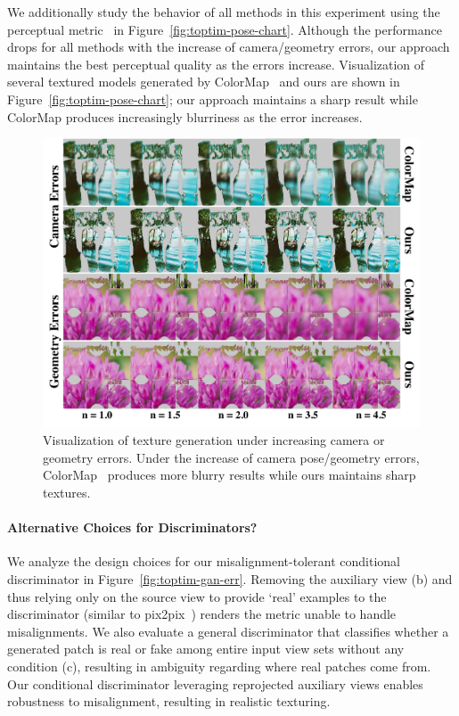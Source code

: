 We additionally study the behavior of all methods in this experiment using the perceptual metric~\cite{zhang2018unreasonable} in Figure~\ref{fig:toptim-pose-chart}.
Although the performance drops for all methods with the increase of camera/geometry errors, our approach maintains the best perceptual quality as the errors increase. Visualization of several textured models generated by ColorMap~\cite{zhou2014color} and ours are shown in Figure~\ref{fig:toptim-pose-chart}; our approach maintains a sharp result while ColorMap produces increasingly blurriness as the error increases. 

\begin{figure}
    \centering
    \includegraphics[width=0.8\linewidth]{texturegen/figures/results-synth-diff.pdf}
    \caption{Visualization of texture generation under increasing camera or geometry errors. Under the increase of camera pose/geometry errors, ColorMap~\cite{zhou2014color} produces more blurry results while ours maintains sharp textures.}
    \label{fig:pose-diff}
\end{figure}

\paragraph*{Alternative Choices for Discriminators?} 
We analyze the design choices for our misalignment-tolerant conditional discriminator in Figure~\ref{fig:toptim-gan-err}.
Removing the auxiliary view (b) and thus relying only on the source view to provide `real' examples to the discriminator (similar to pix2pix~\cite{isola2017image}) renders the metric unable to handle misalignments.
We also evaluate a  general discriminator that classifies whether a generated patch is real or fake among entire input view sets without any condition (c), resulting in ambiguity regarding where real patches come from. 
Our conditional discriminator leveraging reprojected auxiliary views enables robustness to misalignment, resulting in realistic texturing.

